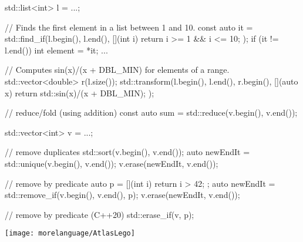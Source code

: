 \begin{frame}[fragile]
  \begin{cppcode}
    std::list<int> l = ...;

    // Finds the first element in a list between 1 and 10.
    const auto it = std::find_if(l.begin(), l.end(),
        [](int i) { return i >= 1 && i <= 10; });
    if (it != l.end()) {
      int element = *it; ...
    }

    // Computes sin(x)/(x + DBL_MIN) for elements of a range.
    std::vector<double> r(l.size());
    std::transform(l.begin(), l.end(), r.begin(),
      [](auto x) { return std::sin(x)/(x + DBL_MIN); });

    // reduce/fold (using addition)
    const auto sum = std::reduce(v.begin(), v.end());
  \end{cppcode}
\end{frame}

\begin{frame}[fragile]
  \begin{cppcode}
    std::vector<int> v = ...;

    // remove duplicates
    std::sort(v.begin(), v.end());
    auto newEndIt = std::unique(v.begin(), v.end());
    v.erase(newEndIt, v.end());

    // remove by predicate
    auto p = [](int i) { return i > 42; };
    auto newEndIt = std::remove_if(v.begin(), v.end(), p);
    v.erase(newEndIt, v.end());

    // remove by predicate (C++20)
    std::erase_if(v, p);
  \end{cppcode}
\end{frame}

\begin{frame}[fragile]
  \begin{block}{}
    \texttt{[image: morelanguage/AtlasLego]}
  \end{block}
\end{frame}

